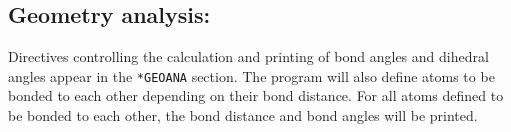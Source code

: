 %
%
%
%
%
%

\subsection{Geometry analysis: }

Directives controlling the calculation and printing of bond angles
and dihedral angles appear in the \verb|*GEOANA| section. The program will also define atoms 
to be bonded to each other depending on their bond distance. For all atoms
defined to be bonded to each other, the bond distance and bond angles
will be printed.

